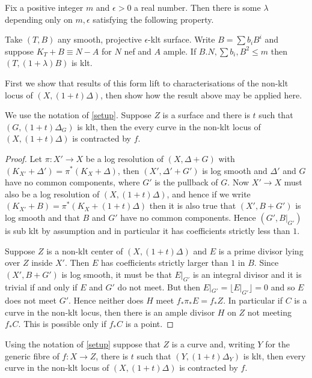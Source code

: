 \documentclass[a4paper,12pt]{book}
\begin{document}
\begin{theorem}\label{Jiang}\cite[Theorem 5.1]{jiang2018birational}
	Fix a positive integer $m$ and $\epsilon >0$ a real number. Then there is some $\lambda$ depending only on $m,\epsilon$ satisfying the following property.
	
	Take $(T,B)$ any smooth, projective $\epsilon$-klt surface. Write $B=\sum b_{i}B^{i}$ and suppose $K_{T}+B \equiv N-A$ for $N$ nef and $A$ ample. If $B.N,\sum b_{i}, B^{2} \leq m$ then $(T,(1+\lambda)B)$ is klt. 
\end{theorem}
First we show that results of this form lift to characterisations of the non-klt locus of $(X,(1+t)\Delta)$, then show how the result above may be applied here.
\begin{lemma}
	 We use the notation of \autoref{setup}. Suppose $Z$ is a surface and there is $t$ such that $(G,(1+t)\Delta_{G})$ is klt, then the every curve in the non-klt locus of $(X,(1+t)\Delta)$ is contracted by $f$.
\end{lemma}
\begin{proof}
	Let $\pi\colon X' \to X$ be a log resolution of $(X,\Delta+G)$ with $(K_{X'}+\Delta')=\pi^{*}(K_{X}+\Delta)$, then $(X',\Delta'+G')$ is log smooth and $\Delta'$ and $G$ have no common components, where $G'$ is the pullback of $G$. Now $X' \to X$ must also be a log resolution of $(X,(1+t)\Delta)$, and hence if we write $(K_{X'}+B)=\pi^{*}(K_{X}+(1+t)\Delta)$ then it is also true that $(X',B+G')$ is log smooth and that $B$ and $G'$ have no common components. Hence $(G',B|_{G'})$ is sub klt by assumption and in particular it has coefficients strictly less than $1$. 
	
	Suppose $Z$ is a non-klt center of $(X,(1+t)\Delta)$ and $E$ is a prime divisor lying over $Z$ inside $X'$. Then $E$ has coefficients strictly larger than $1$ in $B$. Since $(X',B+G')$ is log smooth, it must be that $E|_{G'}$ is an integral divisor and it is trivial if and only if $E$ and $G'$ do not meet. But then $E|_{G'} =\lfloor E|_{G'} \rfloor =0$ and so $E$ does not meet $G'$. Hence neither does $H$ meet $f_{*}\pi_{*}E=f_{*}Z$. In particular if $C$ is a curve in the non-klt locus, then there is an ample divisor $H$ on $Z$ not meeting $f_{*}C$. This is possible only if $f_{*}C$ is a point. 
\end{proof}


\begin{lemma}
	Using the notation of \autoref{setup} suppose that $Z$ is a curve and, writing $Y$ for the generic fibre of $f\colon X\to Z$, there is $t$ such that $(Y,(1+t)\Delta_{Y})$ is klt, then every curve in the non-klt locus of $(X,(1+t)\Delta)$ is contracted by $f$.
\end{lemma}
\end{document}
